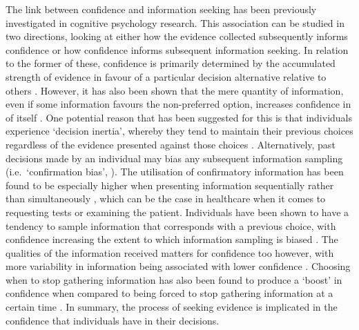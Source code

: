 \documentclass[a4paper, nobind]{templates/ociamthesis}
\begin{document}
The link between confidence and information seeking has been previously investigated in cognitive psychology research. This association can be studied in two directions, looking at either how the evidence collected subsequently informs confidence or how confidence informs subsequent information seeking. In relation to the former of these, confidence is primarily determined by the accumulated strength of evidence in favour of a particular decision alternative relative to others \autocite{vickers_effects_1982}. However, it has also been shown that the mere quantity of information, even if some information favours the non-preferred option, increases confidence in of itself \autocite{ko_divergent_2022}. One potential reason that has been suggested for this is that individuals experience `decision inertia', whereby they tend to maintain their previous choices regardless of the evidence presented against those choices \autocite{akaishi_autonomous_2014}. Alternatively, past decisions made by an individual may bias any subsequent information sampling (i.e.~`confirmation bias', \autocite{nickerson_confirmation_1998}). The utilisation of confirmatory information has been found to be especially higher when presenting information sequentially rather than simultaneously \autocite{jonas_confirmation_2001}, which can be the case in healthcare when it comes to requesting tests or examining the patient. Individuals have been shown to have a tendency to sample information that corresponds with a previous choice, with confidence increasing the extent to which information sampling is biased \autocite{kaanders_humans_2022}. The qualities of the information received matters for confidence too however, with more variability in information being associated with lower confidence \autocite{desender_subjective_2018}. Choosing when to stop gathering information has also been found to produce a `boost' in confidence when compared to being forced to stop gathering information at a certain time \autocite{wei_confidence_2021}. In summary, the process of seeking evidence is implicated in the confidence that individuals have in their decisions.
\end{document}
